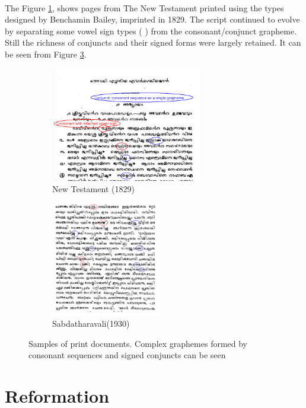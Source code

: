 \documentclass[10pt]{article}
\begin{document}
\paragraph{}
The Figure \ref{newtestament}, shows pages from The New Testament printed using the types designed by Benchamin Bailey, imprinted in 1829\cite{babucherian}. The script continued to evolve by separating some vowel sign types ({ }) from the consonant/conjunct grapheme. Still the richness of conjuncts and their signed forms were largely retained. It can be seen from Figure \ref{Sabdatharavali}. 


\begin{figure}[h!]
\begin{subfigure}{.5\textwidth}
 \centering
 \includegraphics[width=\linewidth, height=5cm]{images/newtestament1829.png}
 \caption{New Testament (1829)}
 \label{newtestament}
\end{subfigure}%
\begin{subfigure}{.5\textwidth}
 \centering
 \includegraphics[width=\linewidth,height=5cm]{images/1930-Sabdatharavali.png}
 \caption{Sabdatharavali(1930)}
 \label{Sabdatharavali}
\end{subfigure}
\caption{Samples of print documents. Complex graphemes formed by consonant sequences and signed conjuncts can be seen}
\end{figure}


\section{Reformation}
\end{document}

